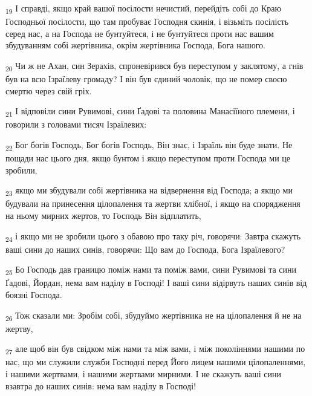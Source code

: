 \begin{tcolorbox}
\textsubscript{19} І справді, якщо край вашої посілости нечистий, перейдіть собі до Краю Господньої посілости, що там пробуває Господня скинія, і візьміть посілість серед нас, а на Господа не бунтуйтеся, і не бунтуйтеся проти нас вашим збудуванням собі жертівника, окрім жертівника Господа, Бога нашого.
\end{tcolorbox}
\begin{tcolorbox}
\textsubscript{20} Чи ж не Ахан, син Зерахів, спроневірився був переступом у заклятому, а гнів був на всю Ізраїлеву громаду? І він був єдиний чоловік, що не помер своєю смертю через свій гріх.
\end{tcolorbox}
\begin{tcolorbox}
\textsubscript{21} І відповіли сини Рувимові, сини Ґадові та половина Манасіїного племени, і говорили з головами тисяч Ізраїлевих:
\end{tcolorbox}
\begin{tcolorbox}
\textsubscript{22} Бог богів Господь, Бог богів Господь, Він знає, і Ізраїль він буде знати. Не пощади нас цього дня, якщо бунтом і якщо переступом проти Господа ми це зробили,
\end{tcolorbox}
\begin{tcolorbox}
\textsubscript{23} якщо ми збудували собі жертівника на відвернення від Господа; а якщо ми будували на принесення цілопалення та жертви хлібної, і якщо на спорядження на ньому мирних жертов, то Господь Він відплатить,
\end{tcolorbox}
\begin{tcolorbox}
\textsubscript{24} і якщо ми не зробили цього з обавою про таку річ, говорячи: Завтра скажуть ваші сини до наших синів, говорячи: Що вам до Господа, Бога Ізраїлевого?
\end{tcolorbox}
\begin{tcolorbox}
\textsubscript{25} Бо Господь дав границю поміж нами та поміж вами, сини Рувимові та сини Ґадові, Йордан, нема вам наділу в Господі! І ваші сини відірвуть наших синів від боязні Господа.
\end{tcolorbox}
\begin{tcolorbox}
\textsubscript{26} Тож сказали ми: Зробім собі, збудуймо жертівника не на цілопалення й не на жертву,
\end{tcolorbox}
\begin{tcolorbox}
\textsubscript{27} але щоб він був свідком між нами та між вами, і між поколіннями нашими по нас, що ми служили служби Господні перед Його лицем нашими цілопаленнями, і нашими жертвами, і нашими жертвами мирними. І не скажуть ваші сини взавтра до наших синів: нема вам наділу в Господі!
\end{tcolorbox}
